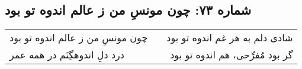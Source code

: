 \begin{center}
\section*{شماره ۷۳: چون مونسِ من ز عالم اندوه تو بود}
\label{sec:073}
\begin{longtable}{l p{0.5cm} r}
چون مونسِ من ز عالم اندوه تو بود
&&
شادی دلم به هر غم اندوه تو بود
\\
درد دلِ اندوهگِنَم در همه عمر
&&
گر بود مُفرِّحی، هم اندوه تو بود
\\
\end{longtable}
\end{center}
